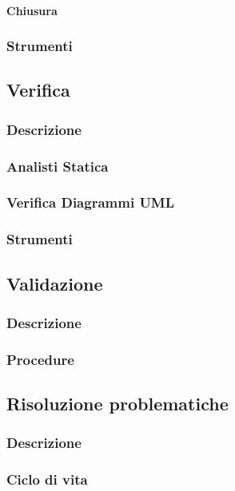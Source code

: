 	\paragraph{Chiusura}
	
\subsubsection{Strumenti}

\subsection{Verifica}
	\subsubsection{Descrizione}
	\subsubsection{Analisti Statica}
	\subsubsection{Verifica Diagrammi UML}
	\subsubsection{Strumenti}
	
\subsection{Validazione}
	\subsubsection{Descrizione}
	\subsubsection{Procedure}


\subsection{Risoluzione problematiche}

	\subsubsection{Descrizione}
	
	\subsubsection{Ciclo di vita}
